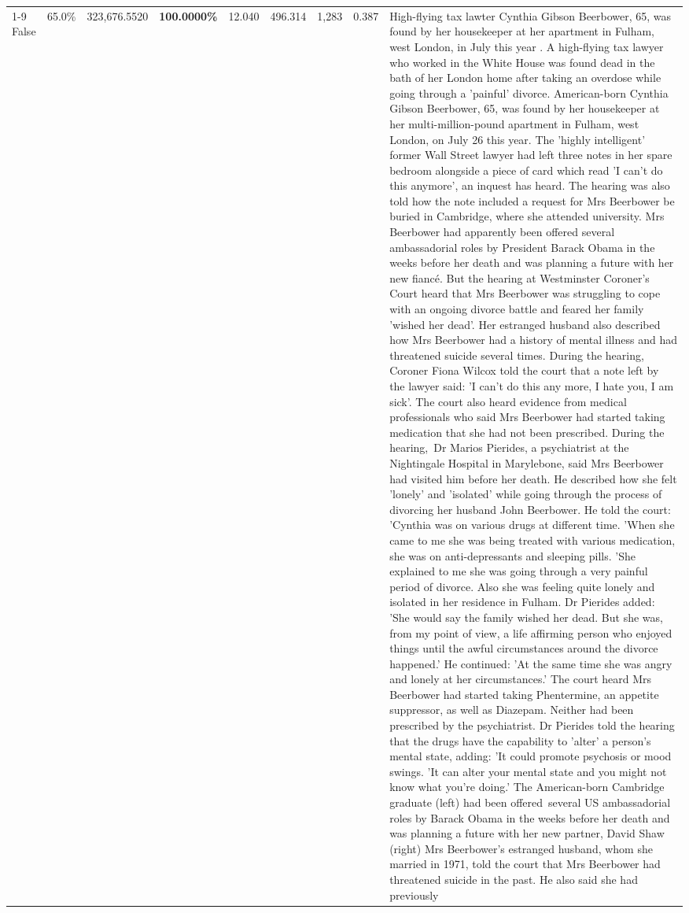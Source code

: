 \begin{table}[H]
\begin{tabular}{lllrlllll}
\cline{1-9}
False & 65.0\% & 323,676.5520 & \bfseries \color{red} 100.0000\% & 12.040 & 496.314 & 1,283 & 0.387 & High-flying tax lawter Cynthia Gibson Beerbower, 65, was found by her housekeeper at her apartment in Fulham, west London, in July this year . A high-flying tax lawyer who worked in the White House was found dead in the bath of her London home after taking an overdose while going through a 'painful' divorce. American-born Cynthia Gibson Beerbower, 65, was found by her housekeeper at her multi-million-pound apartment in Fulham, west London, on July 26 this year. The 'highly intelligent' former Wall Street lawyer had left three notes in her spare bedroom alongside a piece of card which read 'I can't do this anymore', an inquest has heard. The hearing was also told how the note included a request for Mrs Beerbower be buried in Cambridge, where she attended university. Mrs Beerbower had apparently been offered several ambassadorial roles by President Barack Obama in the weeks before her death and was planning a future with her new fiancé. But the hearing at Westminster Coroner's Court heard that Mrs Beerbower was struggling to cope with an ongoing divorce battle and feared her family 'wished her dead'. Her estranged husband also described how Mrs Beerbower had a history of mental illness and had threatened suicide several times. During the hearing, Coroner Fiona Wilcox told the court that a note left by the lawyer said: 'I can't do this any more, I hate you, I am sick'. The court also heard evidence from medical professionals who said Mrs Beerbower had started taking medication that she had not been prescribed. During the hearing, Dr Marios Pierides, a psychiatrist at the Nightingale Hospital in Marylebone, said Mrs Beerbower had visited him before her death. He described how she felt 'lonely' and 'isolated' while going through the process of divorcing her husband John Beerbower. He told the court: 'Cynthia was on various drugs at different time. 'When she came to me she was being treated with various medication, she was on anti-depressants and sleeping pills. 'She explained to me she was going through a very painful period of divorce. Also she was feeling quite lonely and isolated in her residence in Fulham. Dr Pierides added: 'She would say the family wished her dead. But she was, from my point of view, a life affirming person who enjoyed things until the awful circumstances around the divorce happened.' He continued: 'At the same time she was angry and lonely at her circumstances.' The court heard Mrs Beerbower had started taking Phentermine, an appetite suppressor, as well as Diazepam. Neither had been prescribed by the psychiatrist. Dr Pierides told the hearing that the drugs have the capability to 'alter' a person's mental state, adding: 'It could promote psychosis or mood swings. 'It can alter your mental state and you might not know what you're doing.' The American-born Cambridge graduate (left) had been offered several US ambassadorial roles by Barack Obama in the weeks before her death and was planning a future with her new partner, David Shaw (right) Mrs Beerbower's estranged husband, whom she married in 1971, told the court that Mrs Beerbower had threatened suicide in the past. He also said she had previously 
\end{tabular}
\end{table}
